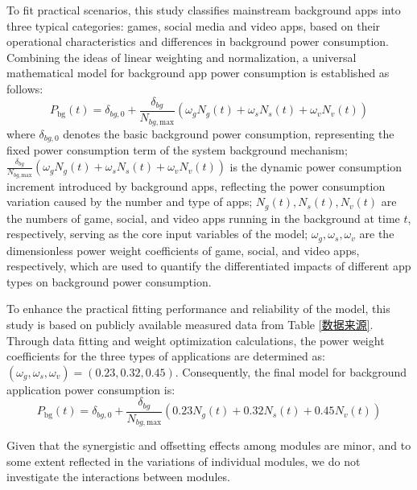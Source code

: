 \documentclass{mcmthesis}  %
\begin{document}
\begin{enumerate}[label=\bfseries\arabic*.]
		To fit practical scenarios, this study classifies mainstream background apps into three typical categories: games, social media and video apps, based on their operational characteristics and differences in background power consumption. Combining the ideas of linear weighting and normalization, a universal mathematical model for background app power consumption is established as follows:
		\begin{equation}
			P_{\text{bg}}(t) = \delta_{bg,0} + \frac{\delta_{bg}}{N_{bg,\text{max}}} \left( \omega_g N_g(t) + \omega_s N_s(t) + \omega_v N_v(t) \right)
		\end{equation}
		where $\delta_{bg,0}$ denotes the basic background power consumption, representing the fixed power consumption term of the system background mechanism; \footnotesize
		$
		\frac{\delta_{bg}}{N_{bg,\text{max}}} \left( \omega_g N_g(t) + \omega_s N_s(t) + \omega_v N_v(t) \right)
		$
		\normalsize is the dynamic power consumption increment introduced by background apps, reflecting the power consumption variation caused by the number and type of apps; $N_g(t), N_s(t), N_v(t)$ are the numbers of game, social, and video apps running in the background at time $t$, respectively, serving as the core input variables of the model; $\omega_g, \omega_s, \omega_v$ are the dimensionless power weight coefficients of game, social, and video apps, respectively, which are used to quantify the differentiated impacts of different app types on background power consumption.
		
		To enhance the practical fitting performance and reliability of the model, this study is based on publicly available measured data from Table \ref{数据来源}. Through data fitting and weight optimization calculations, the power weight coefficients for the three types of applications are determined as: $(\omega_g, \omega_s, \omega_v) = (0.23, 0.32, 0.45)$. Consequently, the final model for background application power consumption is:
		\begin{equation}
			P_{\text{bg}}(t) = \delta_{bg,0} + \frac{\delta_{bg}}{N_{bg,\text{max}}} \left( 0.23 N_g(t) + 0.32 N_s(t) + 0.45 N_v(t) \right)
		\end{equation}
		
		Given that the synergistic and offsetting effects among modules are minor, and to some extent reflected in the variations of individual modules, we do not investigate the interactions between modules.
		
	\end{enumerate}
		
\end{document}
